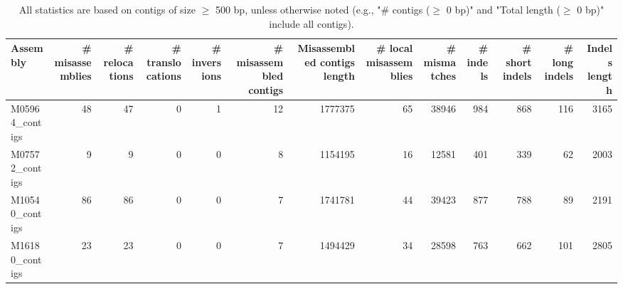 \documentclass[12pt,a4paper]{article}
\begin{document}
\begin{table}[ht]
\begin{center}
\caption{All statistics are based on contigs of size $\geq$ 500 bp, unless otherwise noted (e.g., "\# contigs ($\geq$ 0 bp)" and "Total length ($\geq$ 0 bp)" include all contigs).}
\begin{tabular}{|l*{12}{|r}|}
\hline
Assembly & \# misassemblies &     \# relocations &     \# translocations &     \# inversions & \# misassembled contigs & Misassembled contigs length & \# local misassemblies & \# mismatches & \# indels &     \# short indels &     \# long indels & Indels length \\ \hline
M05964\_contigs & 48 & 47 & 0 & 1 & 12 & 1777375 & 65 & 38946 & 984 & 868 & 116 & 3165 \\ \hline
M07572\_contigs & 9 & 9 & 0 & 0 & 8 & 1154195 & 16 & 12581 & 401 & 339 & 62 & 2003 \\ \hline
M10540\_contigs & 86 & 86 & 0 & 0 & 7 & 1741781 & 44 & 39423 & 877 & 788 & 89 & 2191 \\ \hline
M16180\_contigs & 23 & 23 & 0 & 0 & 7 & 1494429 & 34 & 28598 & 763 & 662 & 101 & 2805 \\ \hline
\end{tabular}
\end{center}
\end{table}
\end{document}
